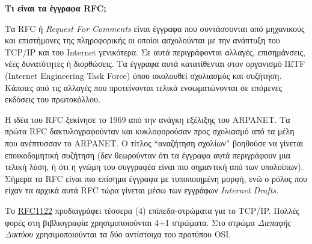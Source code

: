 \begin{inthebox}
\textbf{Τι είναι τα έγγραφα RFC;}

Τα RFC ή \emph{Request For Comments} είναι έγγραφα που συντάσσονται από μηχανικούς και επιστήμονες της πληροφορικής οι οποίοι ασχολούνται με την ανάπτυξη του TCP/IP και του Internet γενικότερα. Σε αυτά περιγράφονται αλλαγές, επισημάνσεις, νέες δυνατότητες ή διορθώσεις. Τα έγγραφα αυτά κατατίθενται στον οργανισμό IETF (Internet Engineering Task Force) όπου ακολουθεί σχολιασμός και συζήτηση. Κάποιες από τις αλλαγές που προτείνονται τελικά ενσωματώνονται σε επόμενες εκδόσεις του πρωτοκόλλου. 

Η ιδέα του RFC ξεκίνησε το 1969 από την ανάγκη εξέλιξης του ARPANET. Τα πρώτα RFC δακτυλογραφούνταν και κυκλοφορούσαν προς σχολιασμό από τα μέλη που ανέπτυσσαν το ARPANET. Ο τίτλος ``αναζήτηση σχολίων'' βοηθούσε να γίνεται εποικοδομητική συζήτηση (δεν θεωρούνταν ότι τα έγγραφα αυτά περιγράφουν μια τελική λύση, ή ότι η γνώμη του συγγραφέα είναι πιο σημαντική από των υπολοίπων). Σήμερα τα RFC είναι πιο επίσημα έγγραφα με τυποποιημένη μορφή, ενώ ο ρόλος που είχαν τα αρχικά αυτά RFC τώρα γίνεται μέσω των εγγράφων \emph{Internet Drafts}.\\
\end{inthebox}

Το  \href{https://tools.ietf.org/html/rfc1122}{RFC1122} προδιαγράφει τέσσερα (4) επίπεδα-στρώματα για το TCP/IP. Πολλές φορές στη βιβλιογραφία χρησιμοποιούνται 4+1 στρώματα. Στο στρώμα \emph{Διεπαφής Δικτύου} χρησιμοποιούνται τα δύο αντίστοιχα του προτύπου OSI.

